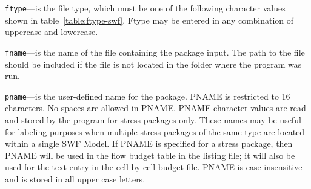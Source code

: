 \begin{description}
\item \texttt{ftype}---is the file type, which must be one of the following character values shown in table~\ref{table:ftype-swf}. Ftype may be entered in any combination of uppercase and lowercase.

\item \texttt{fname}---is the name of the file containing the package input.  The path to the file should be included if the file is not located in the folder where the program was run.

\item \texttt{pname}---is the user-defined name for the package. PNAME is restricted to 16 characters.  No spaces are allowed in PNAME.  PNAME character values are read and stored by the program for stress packages only.  These names may be useful for labeling purposes when multiple stress packages of the same type are located within a single SWF Model.  If PNAME is specified for a stress package, then PNAME will be used in the flow budget table in the listing file; it will also be used for the text entry in the cell-by-cell budget file.  PNAME is case insensitive and is stored in all upper case letters.

\end{description}

